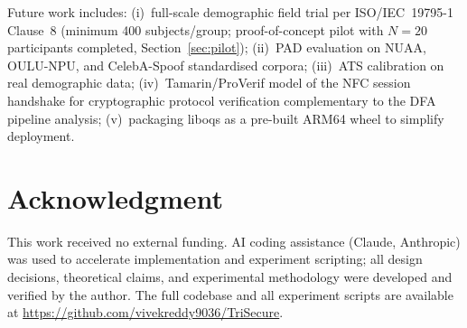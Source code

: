 \documentclass[conference]{IEEEtran}
\begin{document}
Future work includes: (i)~full-scale demographic field trial per
ISO/IEC~19795-1 Clause~8 (minimum 400 subjects/group; proof-of-concept
pilot with \(N{=}20\) participants completed, Section~\ref{sec:pilot});
(ii)~PAD evaluation on NUAA, OULU-NPU, and CelebA-Spoof standardised
corpora; (iii)~ATS calibration on real demographic data;
(iv)~Tamarin/ProVerif model of the NFC session handshake for cryptographic
protocol verification complementary to the DFA pipeline analysis;
(v)~packaging liboqs as a pre-built ARM64 wheel to simplify deployment.

\section*{Acknowledgment}

This work received no external funding. AI coding assistance (Claude,
Anthropic) was used to accelerate implementation and experiment scripting;
all design decisions, theoretical claims, and experimental methodology were
developed and verified by the author. The full codebase and all experiment
scripts are available at \url{https://github.com/vivekreddy9036/TriSecure}.



\end{document}
